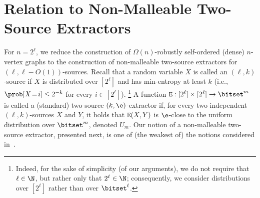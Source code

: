 


































































\setcounter{section}{7}\section{Relation to Non-Malleable Two-Source Extractors}
\label{dense+nmE:sec}
%
%
For $n=2^\ell$,
we reduce the construction of $\Omega(n)$-robustly self-ordered
(dense) $n$-vertex graphs
to the construction of non-malleable two-source extractors
for $(\ell,\ell-O(1))$-sources.
Recall that a random variable $X$ is called an {\sf $(\ell,k)$-source}
if $X$ is distributed over $[2^\ell]$ and has min-entropy at least $k$
(i.e., $\prob[X\!=\!i]\leq2^{-k}$ for every $i\in[2^\ell]$).
\footnote{Indeed, for the sake of simplicity (of our arguments),
we do not require that $\ell\in\N$,
but rather only that $2^\ell\in\N$;
consequently, we consider distributions over $[2^\ell]$
rather than over $\bitset^\ell$.}
%
A function ${\tt E}:[2^\ell]\times[2^\ell]\to\bitset^m$
is called a (standard) {\sf two-source $(k,\e)$-extractor}
if, for every two independent $(\ell,k)$-sources $X$ and $Y$,
it holds that ${\tt E}(X,Y)$ is $\e$-close to the uniform
distribution over $\bitset^m$, denoted $U_m$.
Our notion of a non-malleable two-source extractor, presented next,
is one of (the weakest of) the notions considered in~\cite{CG:nmE,CGL}.

